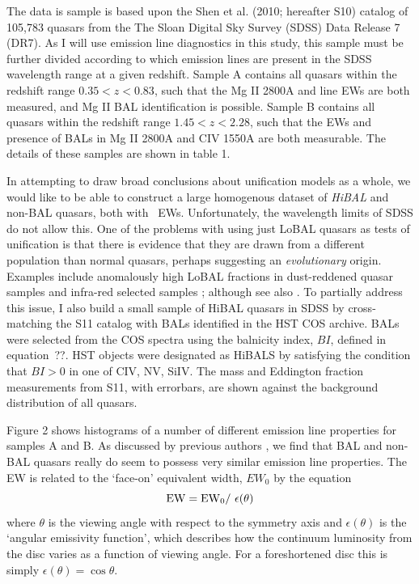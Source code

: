The data is sample is based upon the
Shen et al. (2010; hereafter S10) catalog of
105,783 quasars from the The Sloan Digital Sky Survey (SDSS) Data Release 7 (DR7). 
As I will use emission line diagnostics in this study,
this sample must be further divided according to which 
emission lines are present in 
the SDSS wavelength range at a given redshift. 
Sample A contains all quasars within the redshift range $0.35<z<0.83$, 
such that the Mg II 2800A and \oiiifull line EWs are both measured, 
and Mg II BAL identification
is possible.  Sample B contains all quasars within the redshift 
range $1.45<z<2.28$, such that 
the EWs and presence of BALs in Mg II 2800A and CIV 1550A are both measurable.
The details of these samples are shown in table 1.

In attempting to draw broad conclusions about unification models as a whole,
we would like to be able to construct a large homogenous dataset of 
{\em HiBAL} and non-BAL quasars, both with \oiiifull\ EWs. Unfortunately,
the wavelength limits of SDSS do not allow this. One of the problems with
using just LoBAL quasars as tests of unification is that there is evidence 
that they are drawn from a different population than normal quasars, perhaps
suggesting an {\em evolutionary} origin. Examples include anomalously 
high LoBAL fractions in dust-reddened quasar samples \citep{urrutia2009} 
and infra-red selected samples \citep{dai2012}; 
although see also \cite{lazarova2012}.
To partially address this issue, I also build a small sample 
of HiBAL quasars in SDSS
by cross-matching the S11 catalog with BALs identified in the HST COS archive.
BALs were selected from the COS spectra using the balnicity index, 
$BI$, defined in equation~??. HST objects were designated as HiBALS 
by satisfying the condition that $BI>0$ in one of CIV, NV, SiIV.
The mass and Eddington fraction measurements from S11, with 
errorbars, are shown against the background distribution of all quasars.

Figure 2 shows histograms of a number of different 
emission line properties for samples A and B. 
As discussed by previous authors \cite[e.g.][]{weymann1991}, we find that BAL
and non-BAL quasars really do seem to possess very similar emission line 
properties. The EW is related to the `face-on' equivalent width,
$EW_0$ by the equation
\begin{equation}
{\rm EW} = {\rm EW}_0 /~\epsilon(\theta)
\end{equation}
where $\theta$ is the viewing angle with respect to the symmetry axis 
and $\epsilon(\theta)$ is the `angular emissivity function', which describes 
how the continuum luminosity from the disc varies as a function of viewing angle.
For a foreshortened disc this is simply $\epsilon(\theta) = \cos \theta$.

